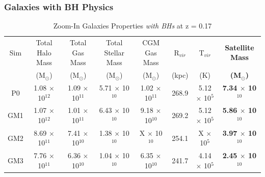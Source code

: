 \documentclass[]{emulateapj}
\begin{document}
\subsubsection{Galaxies with BH Physics} 

\begin{table}[ht!] %
\caption{Zoom-In Galaxies Properties \textit{with BHs} at z = 0.17} %
\centering %
\begin{tabular}{c c c c c c c c} %
\hline\hline %
Sim & Total Halo Mass  & Total Gas Mass & Total Stellar Mass & CGM Gas Mass & R$_{vir}$ & T$_{vir}$ & \textbf{Satellite Mass}\\
 & (M$_{\odot}$) & (M$_{\odot}$) & (M$_{\odot}$) & (M$_{\odot}$) & (kpc) & (K) & \textbf{(M$_{\odot}$)} \\ [0.5ex] %
\hline %
P0 & 1.08 $\times$ 10$^{12}$ & 1.09 $\times$ 10$^{11}$ & 5.71 $\times$ 10$^{10}$ & 1.02 $\times$ 10$^{11}$ & 268.9 & 5.12 $\times$ 10$^5$ & \textbf{7.34 $\times$ 10$^{10}$}\\ %
GM1 & 1.07 $\times$ 10$^{12}$ & 1.01 $\times$ 10$^{11}$ & 6.43 $\times$ 10$^{10}$ & 9.18 $\times$ 10$^{10}$ & 269.2 & 5.12 $\times$ 10$^5$ & \textbf{5.86 $\times$ 10$^{10}$}\\
GM2 & 8.69 $\times$ 10$^{11}$ & 7.41 $\times$ 10$^{10}$ & 1.38 $\times$ 10$^{10}$ & X $\times$ 10$^{10}$ & 254.1 & X $\times$ 10$^5$ & \textbf{3.97 $\times$ 10$^{10}$}  \\ %
GM3 & 7.76 $\times$ 10$^{11}$ & 6.36 $\times$ 10$^{10}$ & 1.04 $\times$ 10$^{10}$ & 6.35 $\times$ 10$^{10}$ & 241.7 & 4.14 $\times$ 10$^5$ & \textbf{2.45 $\times$ 10$^{10}$} \\ [1ex] %
\hline %
\end{tabular}
\label{table:BHdata} %



\end{table}
\end{document}
